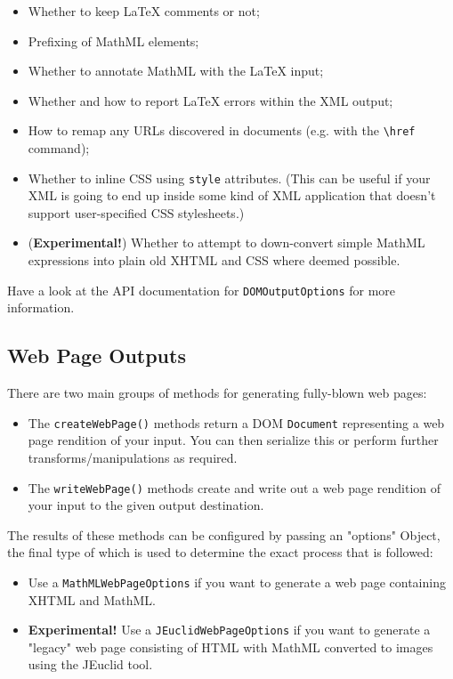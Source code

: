 \begin{itemize}
  \item Whether to keep LaTeX comments or not;
  \item Prefixing of MathML elements;
  \item Whether to annotate MathML with the LaTeX input;
  \item Whether and how to report LaTeX errors within the XML output;
  \item How to remap any URLs discovered in documents (e.g. with the \verb|\href| command);
  \item Whether to inline CSS using \verb|style| attributes. (This can be useful if your XML
    is going to end up inside some kind of XML application that doesn't support user-specified
    CSS stylesheets.)
  \item (\textbf{Experimental!}) Whether to attempt to down-convert simple MathML expressions
    into plain old XHTML and CSS where deemed possible.
\end{itemize}

Have a look at the API documentation for \verb|DOMOutputOptions| for more information.

\subsection*{Web Page Outputs}

There are two main groups of methods for generating fully-blown web pages:

\begin{itemize}

  \item The \verb|createWebPage()| methods return a DOM \verb|Document|
    representing a web page rendition of your input. You can then serialize this or
    perform further transforms/manipulations as required.

  \item The \verb|writeWebPage()| methods create and write out a web page
    rendition of your input to the given output destination.

\end{itemize}

The results of these methods can be configured by passing an "options" Object, the
final type of which is used to determine the exact process that is followed:

\begin{itemize}
  \item Use a \verb|MathMLWebPageOptions| if you want to generate a web
    page containing XHTML and MathML.

  \item \textbf{Experimental!} Use a \verb|JEuclidWebPageOptions| if you
    want to generate a "legacy" web page consisting of HTML with MathML converted
    to images using the JEuclid tool.
\end{itemize}

